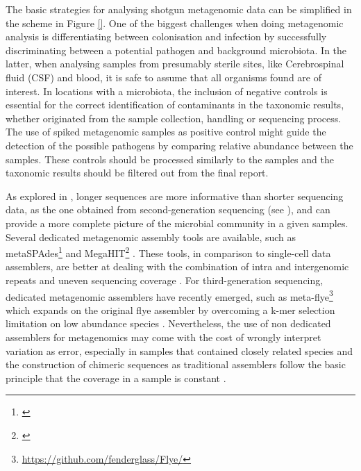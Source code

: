 The basic strategies for analysing shotgun metagenomic data can be simplified in the scheme in Figure \ref{}. 
One of the biggest challenges when doing metagenomic analysis is differentiating between colonisation and infection by successfully discriminating between a potential pathogen and background microbiota. 
In the latter, when analysing samples from presumably sterile sites, like Cerebrospinal fluid (CSF) and blood, it is safe to assume that all organisms found are of interest. 
In locations with a microbiota, the inclusion of negative controls is essential for the correct identification of contaminants in the taxonomic results, whether originated from the sample collection, handling or sequencing process. 
The use of spiked metagenomic samples as positive control might guide the detection of the possible pathogens by comparing relative abundance between the samples. 
These controls should be processed similarly to the samples and the taxonomic results should be filtered out from the final report. 

As explored in , longer sequences are more informative than shorter sequencing data, as the one obtained from second-generation sequencing (see ), and can provide a more complete picture of the microbial community in a given samples. 
Several dedicated metagenomic assembly tools are available, such as metaSPAdes\footnote{\url{}}  and MegaHIT\footnote{\url{}} \citep{nurk_metaspades_2017, li_megahit_2015}. 
These tools, in comparison to single-cell data assemblers, are better at dealing with the combination of intra and intergenomic repeats and uneven sequencing coverage \citep{olson_metagenomic_2017}.
For third-generation sequencing, dedicated metagenomic assemblers have recently emerged, such as meta-flye\footnote{\url{https://github.com/fenderglass/Flye/}} which expands on the original flye assembler by overcoming a k-mer selection limitation on low abundance species \citep{kolmogorov_metaflye_2020}. Nevertheless, the use of non dedicated assemblers for metagenomics may come with the cost of wrongly interpret variation as error, especially in samples that contained closely related species and the construction of chimeric sequences as traditional assemblers follow the basic principle that the coverage in a sample is constant \citep{teeling_current_2012}. 

